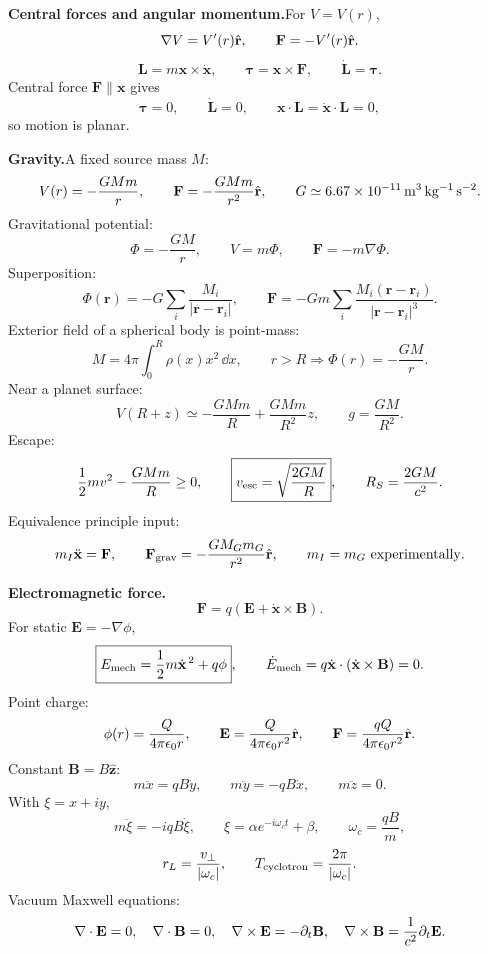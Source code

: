 \noindent\textbf{Central forces and angular momentum.}\quad For $V=V(r)$,
\[
  \nabla V=V'(r)\hat{\mathbf r},\qquad
  \mathbf F=-V'(r)\hat{\mathbf r}.
\]
\[
  \mathbf L=m\mathbf x\times\dot{\mathbf x},\qquad
  \bm\tau=\mathbf x\times\mathbf F,\qquad
  \boxed{\dot{\mathbf L}=\bm\tau}.
\]
Central force $\mathbf F\parallel\mathbf x$ gives
\[
  \bm\tau=0,\qquad \dot{\mathbf L}=0,\qquad
  \mathbf x\cdot\mathbf L=\dot{\mathbf x}\cdot\mathbf L=0,
\]
so motion is planar. 

\noindent\textbf{Gravity.}\quad A fixed source mass $M$:
\[
  V(r)=-\frac{GMm}{r},\qquad
  \mathbf F=-\frac{GMm}{r^2}\hat{\mathbf r},\qquad
  G\simeq 6.67\times10^{-11}\,{\rm m^3\,kg^{-1}\,s^{-2}}.
\]
Gravitational potential:
\[
  \Phi=-\frac{GM}{r},\qquad V=m\Phi,\qquad \mathbf F=-m\nabla\Phi.
\]
Superposition:
\[
  \Phi(\mathbf r)=-G\sum_i\frac{M_i}{|\mathbf r-\mathbf r_i|},\qquad
  \mathbf F=-Gm\sum_i\frac{M_i(\mathbf r-\mathbf r_i)}{|\mathbf r-\mathbf r_i|^3}.
\]
Exterior field of a spherical body is point-mass:
\[
  M=4\pi\int_0^R\rho(x)x^2\,\dd x,\qquad
  r>R\Rightarrow \Phi(r)=-\frac{GM}{r}.
\]
Near a planet surface:
\[
  V(R+z)\simeq -\frac{GMm}{R}+\frac{GMm}{R^2}z,\qquad g=\frac{GM}{R^2}.
\]
Escape:
\[
  \frac{1}{2} mv^2-\frac{GMm}{R}\ge0,\qquad
  \boxed{v_{\rm esc}=\sqrt{\frac{2GM}{R}}},\qquad
  R_S=\frac{2GM}{c^2}.
\]
Equivalence principle input:
\[
  m_I\ddot{\mathbf x}=\mathbf F,\qquad
  \mathbf F_{\rm grav}=-\frac{GM_Gm_G}{r^2}\hat{\mathbf r},\qquad
  m_I=m_G\ \text{experimentally}.
\]

\noindent\textbf{Electromagnetic force.}\quad
\[
  \boxed{\mathbf F=q(\mathbf E+\dot{\mathbf x}\times\mathbf B)}.
\]
For static $\mathbf E=-\nabla\phi$,
\[
  \boxed{E_{\rm mech}=\frac{1}{2} m\dot{\mathbf x}^{\,2}+q\phi},\qquad
  \dot E_{\rm mech}=q\dot{\mathbf x}\cdot(\dot{\mathbf x}\times\mathbf B)=0.
\]
Point charge:
\[
  \phi(r)=\frac{Q}{4\pi\epsilon_0 r},\qquad
  \mathbf E=\frac{Q}{4\pi\epsilon_0 r^2}\hat{\mathbf r},\qquad
  \mathbf F=\frac{qQ}{4\pi\epsilon_0 r^2}\hat{\mathbf r}.
\]
Constant $\mathbf B=B\hat{\mathbf z}$:
\[
  m\ddot x=qB\dot y,\qquad m\ddot y=-qB\dot x,\qquad m\ddot z=0.
\]
With $\xi=x+iy$,
\[
  m\ddot\xi=-iqB\dot\xi,\qquad
  \xi=\alpha e^{-i\omega_c t}+\beta,\qquad
  \omega_c=\frac{qB}{m},
\]
\[
  r_L=\frac{v_\perp}{|\omega_c|},\qquad
  T_{\rm cyclotron}=\frac{2\pi}{|\omega_c|}.
\]
Vacuum Maxwell equations:
\[
  \nabla\cdot\mathbf E=0,\quad \nabla\cdot\mathbf B=0,\quad
  \nabla\times\mathbf E=-\partial_t\mathbf B,\quad
  \nabla\times\mathbf B=\frac{1}{c^2}\partial_t\mathbf E.
\]

